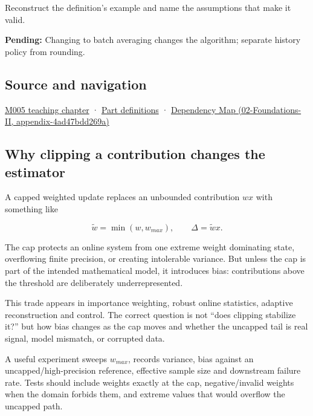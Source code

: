 Reconstruct the definition's example and name the assumptions that make it valid.

\textbf{Pending:} Changing to batch averaging changes the algorithm; separate history policy from rounding.

\subsection{Source and navigation}\label{appendix-1e45d0613db3-source-and-navigation}

\hyperref[01-foundations-i-ch001-when-arithmetic-meets-uncertainty]{M005 teaching chapter} · \hyperref[appendix-fd090d982a15-m005---parts-77-88]{Part definitions} · \href{../02-Foundations-II/main.pdf\#nameddest=appendix-4ad47bdd269a}{Dependency Map (02-Foundations-II, appendix-4ad47bdd269a)}

\subsection{Why clipping a contribution changes the estimator}\label{appendix-1e45d0613db3-why-clipping-a-contribution-changes-the-estimator}

A capped weighted update replaces an unbounded contribution \(w x\) with something like

\[
\tilde w = \min(w,w_{max}),
\qquad
\Delta = \tilde w x.
\]

The cap protects an online system from one extreme weight dominating state, overflowing finite precision, or creating intolerable variance. But unless the cap is part of the intended mathematical model, it introduces bias: contributions above the threshold are deliberately underrepresented.

This trade appears in importance weighting, robust online statistics, adaptive reconstruction and control. The correct question is not ``does clipping stabilize it?'' but how bias changes as the cap moves and whether the uncapped tail is real signal, model mismatch, or corrupted data.

A useful experiment sweeps \(w_{max}\), records variance, bias against an uncapped/high-precision reference, effective sample size and downstream failure rate. Tests should include weights exactly at the cap, negative/invalid weights when the domain forbids them, and extreme values that would overflow the uncapped path.
